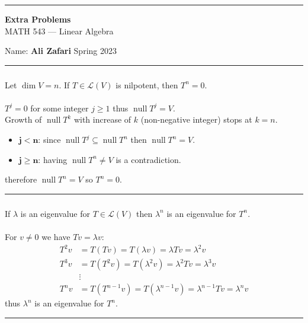 \documentclass[12pt, letterpaper]{scrartcl}
\DeclareMathOperator{\Null}{null}
\begin{document}
\begin{center}
    \hrule
    \vspace{0.4cm}
    { \textbf{{\large Extra Problems}} \\ MATH 543 --- Linear Algebra}
\end{center}
{ Name: \textbf{Ali Zafari} \hspace{\fill} Spring 2023 } \newline\hrule

\subsubsection*{}
{\color{blue}Let $\dim V=n$. If  $T\in\mathcal{L}(V)$ is nilpotent, then $T^n=0$.}
\\\\
$T^j=0$ for some integer $j\geq 1$  thus $\Null T^j=V$.\\
Growth of $\Null T^k$ with increase of $k$ (non-negative integer) stops at $k=n$.
\begin{itemize}
    \item $\mathbf{j<n}$:  since $\Null T^j\subseteq \Null T^n$ then $\Null T^n=V$. 

    \item $\mathbf{j\geq n}$: having $\Null T^n\neq V$ is a contradiction. 
\end{itemize}
therefore $\Null T^n=V$ so $T^n=0$.
\vskip1mm\hrule


\subsubsection*{}
{\color{blue}If $\lambda$ is an eigenvalue for $T\in\mathcal{L}(V)$ then $\lambda^n$ is an eigenvalue for $T^n$.}
\\\\
For $v\neq0$ we have $Tv=\lambda v$:
\begin{align*}
    T^2v&=T(Tv)=T(\lambda v)=\lambda Tv=\lambda^2v\\
    T^3v&=T(T^2v)=T(\lambda^2v)=\lambda^2 Tv=\lambda^3v\\
    &\vdots\\
    T^nv&=T(T^{n-1}v)=T(\lambda^{n-1}v)=\lambda^{n-1} Tv=\lambda^nv
\end{align*}
thus $\lambda^n$ is an eigenvalue for $T^n$.
\vskip1mm\hrule
\end{document}
